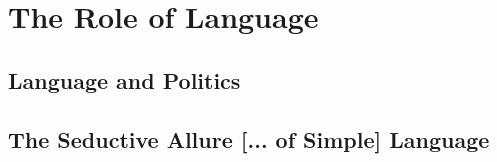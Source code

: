 
\section{The Role of Language}




\subsection{Language and Politics}
\subsection{The Seductive Allure [... of Simple] Language}



  







